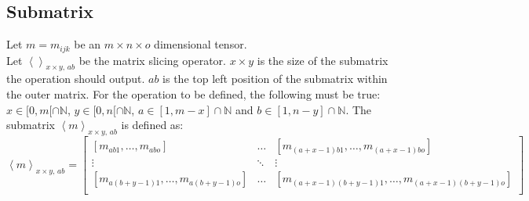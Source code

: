 \documentclass[12pt]{article}
\begin{document}
\subsection{Submatrix}
\label{sec:Ref:submatrix}
Let \(m = m_{ijk}\) be an \(m\times n\times o\) dimensional tensor.\\
Let \(\left<\right>_{x\times y,\,ab}\) be the matrix slicing operator. \(x\times y\) is the size of the submatrix the operation should output. \(ab\) is the top left position of the submatrix within the outer matrix.  For the operation to be defined, the following must be true: \(x \in [0, m[\cap\mathbb N\), \(y \in [0, n[ \cap\mathbb N\), \(a  \in [1, m-x]\cap\mathbb N\) and \(b \in [1, n-y]\cap\mathbb N\). The submatrix \(\left<m\right>_{x\times y,\,ab}\) is defined as:
\begin{equation}
\left<m\right>_{x\times y,\,ab} = 
\left[
\begin{matrix}
[m_{ab1},\dots,m_{abo}] & \dots & [m_{(a+x-1)b1},\dots,m_{(a+x-1)bo}]\\
\vdots &  \ddots & \vdots\\
[m_{a(b+y-1)1},\dots,m_{a(b+y-1)o}] & \dots & [m_{(a+x-1)(b+y-1)1},\dots,m_{(a+x-1)(b+y-1)o}]\\
\end{matrix}\right]
\end{equation}
%
%
\end{document}
